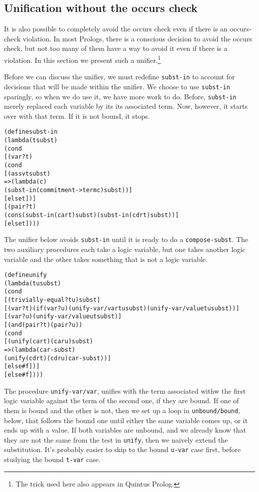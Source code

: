 \subsection{Unification without the occurs check}

It is also possible to completely avoid the occurs check even if
there is an occurs-check violation.  In most Prologs, there is a
conscious decision to avoid the occurs check, but not too many of
them have a way to avoid it even if there is a violation. In
this section we present such a unifier.\footnote{The trick used here
also appears in Quintus Prolog.}

Before we can discuss the unifier, we must redefine \texttt{subst-in}
to account for decisions that will be made within the unifier.  We
choose to use \texttt{subst-in} sparingly, so when we do use it, we
have more work to do.  Before, \texttt{subst-in} merely replaced each
variable by its its associated term.  Now, however, it starts over
with that term.  If it is not bound, it stops.

\begin{alltt}
(define subst-in
  (lambda (t subst)
    (cond
      [(var? t)
       (cond
         [(assv t subst)
          => (lambda (c)
               (subst-in (commitment->term c) subst))]
         [else t])]
      [(pair? t)
       (cons (subst-in (car t) subst) (subst-in (cdr t) subst))]
      [else t])))
\end{alltt}

The unifier below avoids \texttt{subst-in} until it is ready to do
a \texttt{compose-subst}.  The two auxiliary procedures each take
a logic variable, but one takes another logic variable and the other
takes something that is not a logic variable.  

\begin{alltt}
(define unify
  (lambda (t u subst)
    (cond
      [(trivially-equal? t u) subst]
      [(var? t) (if (var? u) (unify-var/var t u subst) (unify-var/value t u subst))]
      [(var? u) (unify-var/value u t subst)]
      [(and (pair? t) (pair? u))
       (cond
         [(unify (car t) (car u) subst)
          => (lambda (car-subst)
               (unify (cdr t) (cdr u) car-subst))]
         [else #f])]
      [else #f])))
\end{alltt}

The procedure \texttt{unify-var/var}, unifies with the term associated
withw the first logic variable against the term of the second one, if
they are bound.  If one of them is bound and the other is not, then we
set up a loop in \texttt{unbound/bound}, below, that follows the bound
one until either the same variable comes up, or it ends up with a
value.  If both variables are unbound, and we already know that they
are not the same from the test in \texttt{unify}, then we naively
extend the substitution.  It's probably easier to skip to the bound
\texttt{u-var} case first, before studying the bound \texttt{t-var}
case.

